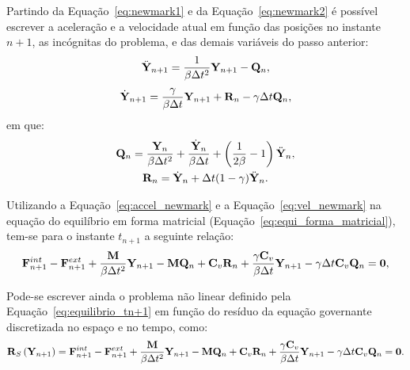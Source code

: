 Partindo da Equação~\eqref{eq:newmark1} e da Equação~\eqref{eq:newmark2} é possível escrever a aceleração e a velocidade atual em função das posições no instante $n+1$, as incógnitas do problema, e das demais variáveis do passo anterior:
\begin{align}
	\ddot{\mathbf{Y}}_{n+1} = \frac{1}{\beta \Delta{t}^2}\mathbf{Y}_{n+1} - \mathbf{Q}_n, \label{eq:accel_newmark}
\end{align}
\begin{align}
	\dot{\mathbf{Y}}_{n+1} = \frac{\gamma}{\beta \Delta{t}}\mathbf{Y}_{n+1} + \mathbf{R}_n - \gamma \Delta{t} \mathbf{Q}_n, \label{eq:vel_newmark}
\end{align}
\noindent em que:
\begin{gather}
	\mathbf{Q}_n = \frac{\mathbf{Y}_n}{\beta \Delta t^2} + \frac{\dot{\mathbf{Y}}_n}{\beta \Delta t} + \left(\frac{1}{2\beta} -1 \right)\ddot{\mathbf{Y}}_n,\label{eq:Qn}\\
	\mathbf{R}_n = \dot{\mathbf{Y}}_n+\Delta t(1-\gamma)\ddot{\mathbf{Y}}_n.\label{eq:Rn}
\end{gather}

Utilizando a Equação~\eqref{eq:accel_newmark} e a Equação~\eqref{eq:vel_newmark} na equação do equilíbrio em forma matricial (Equação~\eqref{eq:equi_forma_matricial}), tem-se para o instante $t_{n+1}$ a seguinte relação:
\begin{gather}
	\mathbf{F}^{int}_{n+1}- \mathbf{F}^{ext}_{n+1} + \frac{\mathbf{M}}{\beta \Delta t^2} \mathbf{Y}_{n+1}-\mathbf{M} \mathbf{Q}_n+ \mathbf{C}_v\mathbf{R}_n + \frac{\gamma \mathbf{C}_v}{\beta \Delta t}\mathbf{Y}_{n+1} - \gamma\Delta t \mathbf{C}_v\mathbf{Q}_n = \mathbf{0},
	\label{eq:equilibrio_tn+1}
\end{gather}

Pode-se escrever ainda o problema não linear definido pela Equação~\eqref{eq:equilibrio_tn+1} em função do resíduo da equação governante
discretizada no espaço e no tempo, como:
\begin{gather}
	\mathbf{R}_S\left(\mathbf{Y}_{n+1}\right) = \mathbf{F}^{int}_{n+1}- \mathbf{F}^{ext}_{n+1} + \frac{\mathbf{M}}{\beta \Delta t^2} \mathbf{Y}_{n+1}-\mathbf{M} \mathbf{Q}_n+ \mathbf{C}_v\mathbf{R}_n + \frac{\gamma \mathbf{C}_v}{\beta \Delta t}\mathbf{Y}_{n+1} - \gamma\Delta t \mathbf{C}_v\mathbf{Q}_n= \mathbf{0}.
	\label{eq:residuo_equilibrio_newmark}
\end{gather}

